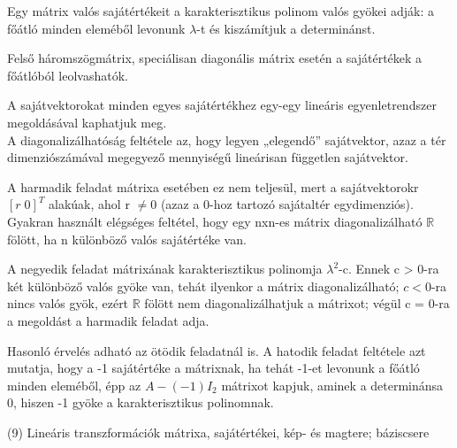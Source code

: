 \begin{frame}
  \begin{tcolorbox}[title={Megoldások {\symking}}]
     Egy mátrix valós sajátértékeit a karakterisztikus polinom valós gyökei adják: a főátló minden eleméből levonunk ${\lambda}$-t és kiszámítjuk a determinánst.\\
     \mmedskip
     
     Felső háromszögmátrix, speciálisan diagonális mátrix esetén a sajátértékek a főátlóból leolvashatók.\\
     \mmedskip
     
     A sajátvektorokat minden egyes sajátértékhez egy-egy lineáris egyenletrendszer megoldásával kaphatjuk meg.\\
     A diagonalizálhatóság feltétele az, hogy legyen „elegendő” sajátvektor, azaz a tér dimenziószámával megegyező mennyiségű lineárisan független sajátvektor.\\
     \mmedskip
     
     A harmadik feladat mátrixa esetében ez nem teljesül, mert a sajátvektorokr $[r \; 0]^T$ alakúak, ahol r $\neq 0$ (azaz a 0-hoz tartozó sajátaltér egydimenziós).\\
     Gyakran használt elégséges feltétel, hogy egy nxn-es mátrix diagonalizálható $\mathbb{R}$ fölött, ha n különböző valós sajátértéke van.\\
     \mmedskip
     
     A negyedik feladat mátrixának karakterisztikus polinomja ${\lambda}^2$-c. Ennek c > 0-ra két különböző valós gyöke van, tehát ilyenkor a mátrix diagonalizálható; $c < 0$-ra nincs valós gyök, ezért $\mathbb{R}$ fölött nem diagonalizálhatjuk a mátrixot; végül c = 0-ra a megoldást a harmadik feladat adja.\\
     \mmedskip
     
     Hasonló érvelés adható az ötödik feladatnál is. A hatodik feladat feltétele azt mutatja, hogy a -1 sajátértéke a mátrixnak, ha tehát -1-et levonunk a főátló minden eleméből, épp az $A-(-1)I_2$ mátrixot kapjuk, aminek a determinánsa 0, hiszen -1 gyöke a karakterisztikus polinomnak.
  \end{tcolorbox}
\end{frame}



\begin{frame}[plain]
\begin{tcolorbox}[center, colback={myyellow}, coltext={black}, colframe={myyellow}]
    {\RHuge  (9) Lineáris transzformációk mátrixa, sajátértékei, kép- és magtere; báziscsere }
    \mmedskip
\end{tcolorbox}
\end{frame}

